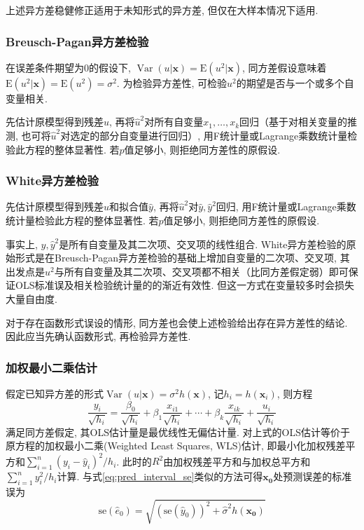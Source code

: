 \par 上述异方差稳健修正适用于未知形式的异方差, 但仅在大样本情况下适用. 

\subsubsection{Breusch-Pagan异方差检验}

\par 在误差条件期望为0的假设下, $\operatorname{Var}(u\vert \textbf{x})=\mathrm{E}(u^2\vert \textbf{x})$, 同方差假设意味着$\mathrm{E}(u^2\vert \textbf{x})= \mathrm{E}(u^2)=\sigma^2$. 为检验异方差性, 可检验$u^2$的期望是否与一个或多个自变量相关. 
\par 先估计原模型得到残差$\hat{u}$, 再将$\hat{u}^2$对所有自变量$x_1,\dots,x_k$回归（基于对相关变量的推测, 也可将$\hat{u}^2$对选定的部分自变量进行回归）, 用F统计量或Lagrange乘数统计量检验此方程的整体显著性. 若$p$值足够小, 则拒绝同方差性的原假设. 

\subsubsection{White异方差检验}

\par 先估计原模型得到残差$\hat{u}$和拟合值$\hat{y}$, 再将$\hat{u}^2$对$\hat{y}, \hat{y}^2$回归, 用F统计量或Lagrange乘数统计量检验此方程的整体显著性. 若$p$值足够小, 则拒绝同方差性的原假设. 
\par 事实上, $\hat{y}, \hat{y}^2$是所有自变量及其二次项、交叉项的线性组合. White异方差检验的原始形式是在Breusch-Pagan异方差检验的基础上增加自变量的二次项、交叉项, 其出发点是$u^2$与所有自变量及其二次项、交叉项都不相关（比同方差假定弱）即可保证OLS标准误及相关检验统计量的的渐近有效性. 但这一方式在变量较多时会损失大量自由度.

\par 对于存在函数形式误设的情形, 同方差也会使上述检验给出存在异方差性的结论. 因此应当先确认函数形式, 再检验异方差性. 

\subsubsection{加权最小二乘估计}

\par 假定已知异方差的形式$\operatorname{Var}(u\vert \mathbf{x})=\sigma^2 h(\mathbf{x})$, 记$h_i=h(\mathbf{x}_i)$, 则方程
\begin{equation}
    \frac{y_i}{\sqrt{h_i}}=\frac{\beta_0}{\sqrt{h_i}}+\beta_1\frac{x_{i1}}{\sqrt{h_i}}+\cdots+\beta_k\frac{x_{ik}}{\sqrt{h_i}}+\frac{u_i}{\sqrt{h_i}}
\label{eq:wls}
\end{equation}
满足同方差假定, 其OLS估计量是最优线性无偏估计量. 对上式的OLS估计等价于原方程的加权最小二乘(Weighted Least Squares, WLS)估计, 即最小化加权残差平方和$\sum_{i=1}^n (y_i-\hat{y}_i)^2/h_i$. 此时的$R^2$由加权残差平方和与加权总平方和$\sum_{i=1}^n y_i^2/h_i$计算. 与式\ref{eq:pred_interval_se}类似的方法可得$\mathbf{x_0}$处预测误差的标准误为
\begin{equation}
    \mathrm{se}(\hat{e}_0)= \sqrt{(\mathrm{se}(\hat{y}_0))^2+\hat{\sigma}^2 h(\mathbf{x_0})}
\end{equation}

